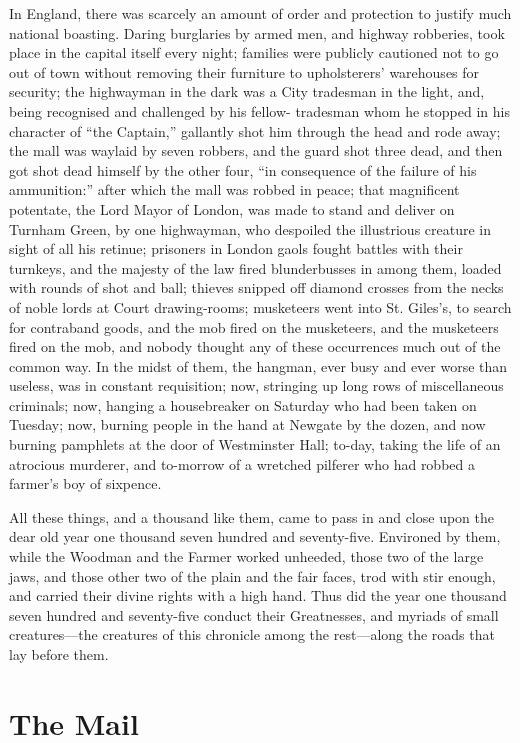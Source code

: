 In England, there was scarcely an amount of order and protection
to justify much national boasting.  Daring burglaries by armed
men, and highway robberies, took place in the capital itself
every night; families were publicly cautioned not to go out of
town without removing their furniture to upholsterers' warehouses
for security; the highwayman in the dark was a City tradesman in
the light, and, being recognised and challenged by his fellow-%
tradesman whom he stopped in his character of ``the Captain,''
gallantly shot him through the head and rode away; the mall was
waylaid by seven robbers, and the guard shot three dead, and then
got shot dead himself by the other four, ``in consequence of the
failure of his ammunition:'' after which the mall was robbed in
peace; that magnificent potentate, the Lord Mayor of London, was
made to stand and deliver on Turnham Green, by one highwayman,
who despoiled the illustrious creature in sight of all his
retinue; prisoners in London gaols fought battles with their
turnkeys, and the majesty of the law fired blunderbusses in among
them, loaded with rounds of shot and ball; thieves snipped off
diamond crosses from the necks of noble lords at Court
drawing-rooms; musketeers went into St. Giles's, to search for
contraband goods, and the mob fired on the musketeers, and the
musketeers fired on the mob, and nobody thought any of these
occurrences much out of the common way.  In the midst of them,
the hangman, ever busy and ever worse than useless, was in
constant requisition; now, stringing up long rows of miscellaneous
criminals; now, hanging a housebreaker on Saturday who had been
taken on Tuesday; now, burning people in the hand at Newgate by
the dozen, and now burning pamphlets at the door of Westminster Hall;
to-day, taking the life of an atrocious murderer, and to-morrow of a
wretched pilferer who had robbed a farmer's boy of sixpence.

All these things, and a thousand like them, came to pass in
and close upon the dear old year one thousand seven hundred
and seventy-five.  Environed by them, while the Woodman and the
Farmer worked unheeded, those two of the large jaws, and those
other two of the plain and the fair faces, trod with stir enough,
and carried their divine rights with a high hand.  Thus did the
year one thousand seven hundred and seventy-five conduct their
Greatnesses, and myriads of small creatures---the creatures of this
chronicle among the rest---along the roads that lay before them.


\chapter{The Mail}


